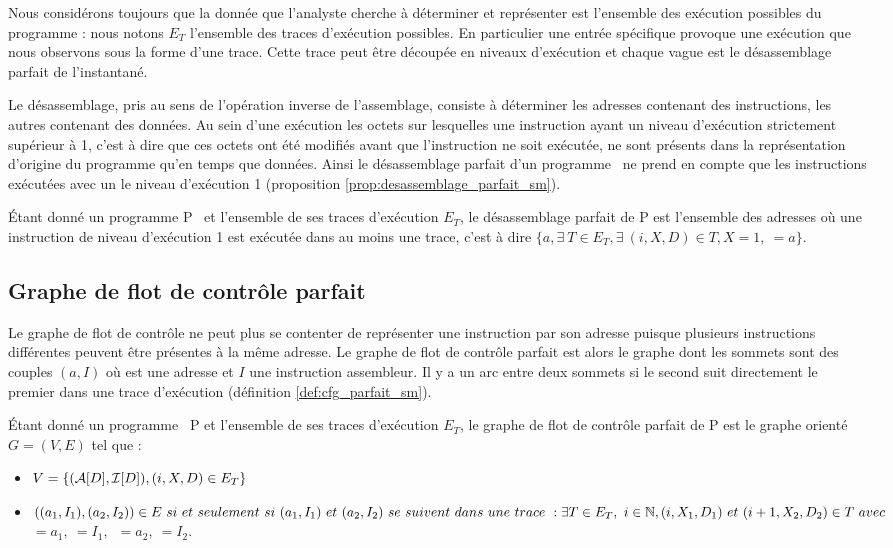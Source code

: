 Nous considérons toujours que la donnée que l'analyste cherche à
déterminer et représenter est l'ensemble des exécution possibles du
programme : nous notons $E_T$ l'ensemble des traces d'exécution possibles.
En particulier une entrée spécifique provoque une exécution que nous observons sous la forme d'une trace.
Cette trace peut être découpée en niveaux d'exécution et chaque vague est le désassemblage parfait de l'instantané.

Le désassemblage, pris au sens de l'opération inverse de l'assemblage,
consiste à déterminer les adresses contenant des instructions, les
autres contenant des données.
Au sein d'une exécution les octets sur lesquelles une instruction ayant
un niveau d'exécution strictement supérieur à 1, c'est à dire que ces
octets ont été modifiés avant que l'instruction ne soit exécutée, ne
sont présents dans la représentation d'origine du programme qu'en temps
que données.
Ainsi le désassemblage parfait d'un programme \sm\ ne prend en compte
que les instructions exécutées avec un le niveau d'exécution 1
(proposition \ref{prop:desassemblage_parfait_sm}).

\begin{prop}
 Étant donné un programme P \sm\ et l'ensemble de ses traces d'exécution
$E_T$, le désassemblage parfait de P est l'ensemble des adresses où une
instruction de niveau d'exécution 1 est exécutée dans au moins une
trace, c'est à dire
 $\{a, \exists\ T\in E_T, \exists\ (i, X, D)\in T, X=1,\ $$=a\}$.
\label{prop:desassemblage_parfait_sm}
\end{prop}


\subsection{Graphe de flot de contrôle parfait}
Le graphe de flot de contrôle ne peut plus se contenter de représenter
une instruction par son adresse puisque plusieurs instructions
différentes peuvent être présentes à la même adresse.
Le graphe de flot de contrôle parfait est alors le graphe dont les
sommets sont des couples $(a, I)$ où  est une adresse et $I$ une
instruction assembleur. Il y a un arc entre deux sommets si le second
suit directement le premier dans une trace d'exécution (définition
\ref{def:cfg_parfait_sm}).

\begin{defi}
 Étant donné un programme \sm\ P et l'ensemble de ses traces d'exécution
$E_T$, le graphe de flot de contrôle parfait de P est le graphe orienté
$G=(V, E)$ tel que :
 \begin{itemize}
  \item $V=\{(\mathcal A[D], \mathcal I[D]),  (i, X, D)\in E_T\}$
  \item $((a_1, I_1), (a_2, I_2))\in E\ si\ et\ seulement\ si\ (a_1,
I_1)\ et\ (a_2, I_2)\ se\ suivent\ dans\ une\ trace\ : \exists T\in
E_T,\ i\in \BN, (i, X_1, D_1)\ et\ (i+1, X_2, D_2)\in T\ avec\
$$=a_1,\ $$=I_1,$~$=a_2,\ $$=I_2$.
 \end{itemize}
\label{def:cfg_parfait_sm}
\end{defi}

